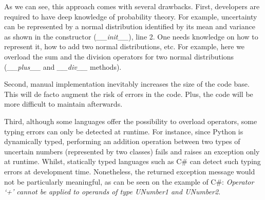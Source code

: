 As we can see, this approach comes with several drawbacks.
First, developers are required to have deep knowledge of probability theory.
For example, uncertainty can be represented by a normal distribution identified by its mean and variance as shown in the constructor (\textit{\_\_init\_\_}), line 2.
One needs knowledge on how to represent it, how to add two normal distributions, etc.
For example, here we overload the sum and the division operators for two normal distributions (\textit{\_\_plus\_\_} and \textit{\_\_div\_\_} methods).

Second, manual implementation inevitably increases the size of the code base.
This will de facto augment the risk of errors in the code.
Plus, the code will be more difficult to maintain afterwards.

Third, although some languages offer the possibility to overload operators, some typing errors can only be detected at runtime. 
For instance, since Python is dynamically typed, performing an addition operation between two types of uncertain numbers (\ie represented by two classes) fails and raises an exception only at runtime.
Whilst, statically typed languages such as C\# can detect such typing errors at development time. 
Nonetheless, the returned exception message would not be particularly meaningful, as can be seen on the example of  C\#: \textit{Operator `+' cannot be applied to operands of type UNumber1 and UNumber2}.

%
%
%
%
%

